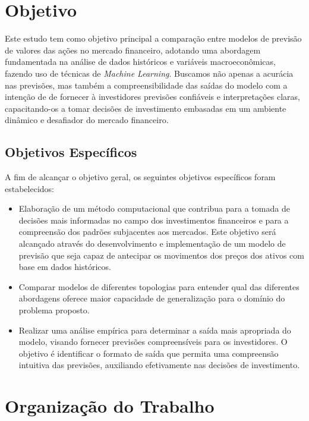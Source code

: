 \section{Objetivo}
\label{sec:objetivo}

Este estudo tem como objetivo principal a comparação entre modelos de previsão de valores das ações no mercado financeiro, adotando uma abordagem fundamentada na análise de dados históricos e variáveis macroeconômicas, fazendo uso de técnicas de \textit{Machine Learning}. Buscamos não apenas a acurácia nas previsões, mas também a compreensibilidade das saídas do modelo com a intenção de de fornecer à investidores previsões confiáveis e interpretações claras, capacitando-os a tomar decisões de investimento embasadas em um ambiente dinâmico e desafiador do mercado financeiro.

\subsection{Objetivos Específicos}
\label{subsec:objespecificos}

A fim de alcançar o objetivo geral, os seguintes objetivos específicos foram estabelecidos:

\begin{itemize}
    \item Elaboração de um método computacional que contribua para a tomada de decisões mais informadas no campo dos investimentos financeiros e para a compreensão dos padrões subjacentes aos mercados. Este objetivo será alcançado através do desenvolvimento e implementação de um modelo de previsão que seja capaz de antecipar os movimentos dos preços dos ativos com base em dados históricos.
    \item Comparar modelos de diferentes topologias para entender qual das diferentes abordagens oferece maior capacidade de generalização para o domínio do problema proposto.
    \item Realizar uma análise empírica para determinar a saída mais apropriada do modelo, visando fornecer previsões compreensíveis para os investidores. O objetivo é identificar o formato de saída que permita uma compreensão intuitiva das previsões, auxiliando efetivamente nas decisões de investimento.
\end{itemize}


\section{Organização do Trabalho}
\label{sec:organizacao}

